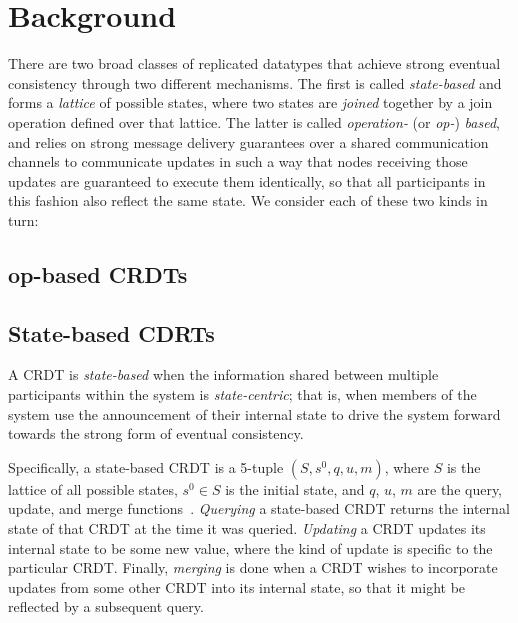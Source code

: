 \chapter{Background}
\label{chap:background}

There are two broad classes of replicated datatypes that achieve strong eventual
consistency through two different mechanisms. The first is called
\textit{state-based} and forms a \textit{lattice} of possible states, where two
states are \textit{joined} together by a join operation defined over that
lattice. The latter is called \textit{operation-} (or \textit{op-})
\textit{based}, and relies on strong message delivery guarantees over a shared
communication channels to communicate updates in such a way that nodes receiving
those updates are guaranteed to execute them identically, so that all
participants in this fashion also reflect the same state. We consider each of
these two kinds in turn:

\section{op-based CRDTs}

\section{State-based CDRTs}
\label{sec:background-state-based-crdts}
A CRDT is \textit{state-based} when the information shared between multiple
participants within the system is \textit{state-centric}; that is, when members
of the system use the announcement of their internal state to drive the system
forward towards the strong form of eventual consistency.

Specifically, a state-based CRDT is a 5-tuple $(S, s^0, q, u, m)$, where $S$ is
the lattice of all possible states, $s^0 \in S$ is the initial state, and $q$,
$u$, $m$ are the query, update, and merge functions~\citep{shapiro11}.
\textit{Querying} a state-based CRDT returns the internal state of that CRDT at
the time it was queried. \textit{Updating} a CRDT updates its internal state to
be some new value, where the kind of update is specific to the particular CRDT.
Finally, \textit{merging} is done when a CRDT wishes to incorporate updates from
some other CRDT into its internal state, so that it might be reflected by a
subsequent query.


